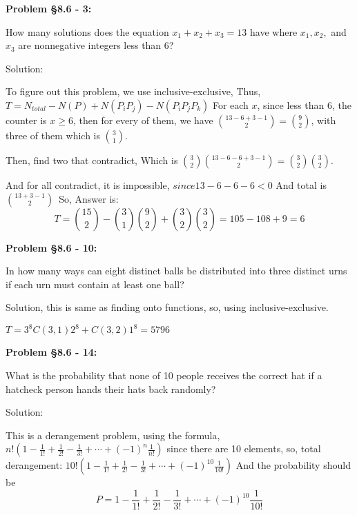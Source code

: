 \documentclass{article}
\newenvironment{problem}[1]
{\begin{mdframed}[default]
\textbf{Problem #1:}
}
{\end{mdframed}
}
\begin{document}
\begin{problem}{\S 8.6 - 3}
How many solutions does the equation $x_1 + x_2 + x_3 = 13$ have where $x_1, x_2,$
and $x_3$ are nonnegative integers less than 6?

Solution:

To figure out this problem, we use inclusive-exclusive, Thus, $T=N_{total}-N(P)+N(P_iP_j)-N(P_iP_jP_k)$
For each $x$, since less than 6, the counter is $x\geq6$, then for every of them, we have ${13-6+3-1\choose 2}={9\choose 2}$, with three of them which is ${3\choose 1}$.

Then, find two that contradict, Which is ${3\choose 2}{13-6-6+3-1\choose 2}={3\choose 2}{3\choose 2}$.

And for all contradict, it is impossible, $since 13-6-6-6<0$
And total is ${13+3-1\choose 2}$\
So, Answer is: \[T={15\choose 2}-{3\choose 1}{9\choose 2}+{3\choose 2}{3\choose 2}=105-108+9=6\]
\end{problem}
\begin{problem}{\S 8.6 - 10}
In how many ways can eight distinct balls be distributed into three distinct urns
if each urn must contain at least one ball?

Solution, this is same as finding onto functions, so, using inclusive-exclusive.

$T=3^8 C(3,1)2^8+C(3,2)1^8=5796$
\end{problem}
\begin{problem}{\S 8.6 - 14}
What is the probability that none of 10 people receives the correct hat if a
hatcheck person hands their hats back randomly?

Solution:

This is a derangement problem, using the formula, $n!(1-\frac{1}{1!}+\frac{1}{2!}-\frac{1}{3!}+\cdots +(-1)^n\frac{1}{n!})$
since there are 10 elements, so, total derangement: $10!(1-\frac{1}{1!}+\frac{1}{2!}-\frac{1}{3!}+\cdots +(-1)^{10}\frac{1}{10!})$
And the probability should be \[P=1-\frac{1}{1!}+\frac{1}{2!}-\frac{1}{3!}+\cdots +(-1)^{10}\frac{1}{10!}\]
\end{problem}
\end{document}
